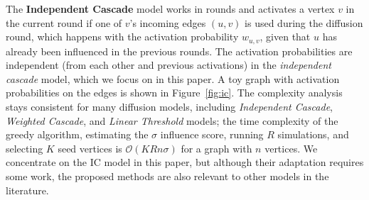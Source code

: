 \documentclass[final,5p,times,twocolumn]{elsarticle}
\newcommand\fixme[1]{#1}
\begin{document}


The {\bf Independent Cascade} model \fixme{works in rounds and activates} a vertex $v$ in the current round if one of $v$'s \fixme{incoming edges $(u, v)$ is used during the diffusion} round, \fixme{which happens with the activation probability $w_{u, v}$, given that $u$ has already been} influenced \fixme{in the previous rounds. The activation probabilities are independent (from each other and previous activations)} in the {\em independent cascade} model, which we focus on in this paper. A toy graph with activation probabilities on the edges is shown in Figure~\ref{fig:ic}.
The complexity analysis stays consistent for many diffusion models, including {\em Independent Cascade}, {\em Weighted Cascade}, and {\em Linear Threshold} models; the time complexity of the greedy algorithm, estimating the $\sigma$ influence score, running $R$ simulations, and selecting $K$ seed vertices is $\mathcal{O}(KRn\sigma)$ for a graph with $n$ vertices. 
We concentrate on the IC model in this paper, but although their adaptation requires some work, the proposed methods are also relevant to other models in the literature.
\end{document}
